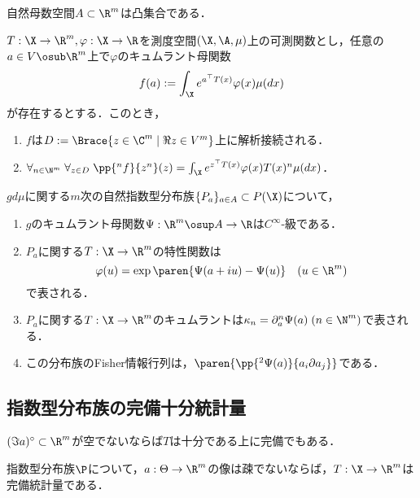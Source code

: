 \documentclass[uplatex,dvipdfmx]{jsreport}
\begin{document}
\begin{proposition}
    自然母数空間$A\subset\R^m$は凸集合である．
\end{proposition}

\begin{lemma}[キュムラント母関数の導関数]
    $T:\X\to\R^m,\varphi:\X\to\R$を測度空間$(\X,\A,\mu)$上の可測関数とし，任意の$a\in V\osub\R^m$上で$\varphi$のキュムラント母関数
    \[f(a):=\int_\X e^{a^\top T(x)}\varphi(x)\mu(dx)\]
    が存在するとする．このとき，
    \begin{enumerate}
        \item $f$は$D:=\Brace{z\in\C^m\mid \Re z\in V^m}$上に解析接続される．
        \item $\forall_{n\in\N^m}\;\forall_{z\in D}\;\pp{^nf}{z^n}(z)=\int_\X e^{z^\top T(x)}\varphi(x)T(x)^n\mu(dx)$．
    \end{enumerate}
\end{lemma}

\begin{proposition}
    $gd\mu$に関する$m$次の自然指数型分布族$\{P_a\}_{a\in A}\subset P(\X)$について，
    \begin{enumerate}
        \item $g$のキュムラント母関数$\Psi:\R^m\osup A\to\R$は$C^\infty$-級である．
        \item $P_a$に関する$T:\X\to\R^m$の特性関数は
        \[\varphi(u)=\exp\paren{\Psi(a+iu)-\Psi(u)}\quad(u\in\R^m)\]
        で表される．
        \item $P_a$に関する$T:\X\to\R^m$のキュムラントは$\kappa_n=\partial^n_a\Psi(a)\;(n\in\N^m)$で表される．
        \item この分布族のFisher情報行列は，$\paren{\pp{^2\Psi(a)}{a_i\partial a_j}}$である．
    \end{enumerate}
\end{proposition}

\subsection{指数型分布族の完備十分統計量}

\begin{tcolorbox}[colframe=ForestGreen, colback=ForestGreen!10!white,breakable,colbacktitle=ForestGreen!40!white,coltitle=black,fonttitle=\bfseries\sffamily,
title=]
    $(\Im a)^\circ\subset\R^m$が空でないならば$T$は十分である上に完備でもある．
\end{tcolorbox}

\begin{theorem}[指数型分布族が完備であるための十分条件]
    指数型分布族$\P$について，$a:\Theta\to\R^m$の像は疎でないならば，$T:\X\to\R^m$は完備統計量である．
\end{theorem}
\end{document}
